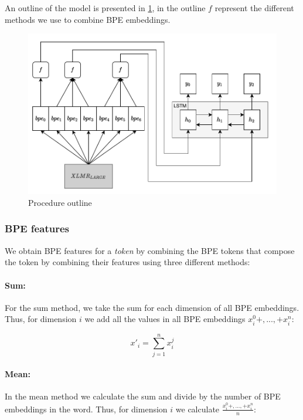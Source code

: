 \documentclass[11pt]{article}
\begin{document}
	An outline of the model is presented in \cref{fig:model}, in the outline $f$ represent the different methods we use to combine BPE embeddings.
	
	\begin{figure}[h!]
		\centering
		\includegraphics[scale=0.2]{model_outline-5.pdf}
		\caption{\label{fig:model} Procedure outline}
	\end{figure}
	
	\subsubsection{BPE features} 	
	
	We obtain BPE features for a \textit{token} by combining the BPE tokens that compose the token by combining their features using three different methods:
	
	\paragraph{Sum:} For the sum method, we take the sum for each dimension of all BPE embeddings. Thus, for dimension $i$ we add all the values in all BPE embeddings $x_i^0 + ,..., + x_i^n$:
	
	\begin{equation}
	x'_{i} = \sum_{j=1}^{n} x_i^j
	\end{equation}
	
	
	\paragraph{Mean:} In the mean method we calculate the sum and divide by the number of BPE embeddings in the word. Thus, for dimension $i$ we calculate $\frac{x_i^0 + ,..., + x_i^n}{n}$: 
	
\end{document}
